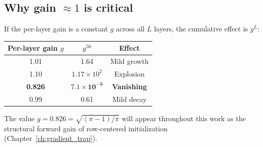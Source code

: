 \subsection{Why gain $\approx 1$ is critical}

If the per-layer gain is a constant $g$ across all $L$ layers, the
cumulative effect is $g^L$:
\begin{center}
\begin{tabular}{ccc}
\toprule
Per-layer gain $g$ & $g^{50}$ & Effect \\
\midrule
1.01 & 1.64 & Mild growth \\
1.10 & $1.17 \times 10^2$ & Explosion \\
\textbf{0.826} & $\bm{7.1 \times 10^{-5}}$ & \textbf{Vanishing} \\
0.99 & 0.61 & Mild decay \\
\bottomrule
\end{tabular}
\end{center}
The value $g = 0.826 = \sqrt{(\pi-1)/\pi}$ will appear throughout this
work as the structural forward gain of row-centered initialization
(Chapter~\ref{ch:gradient_trap}).
